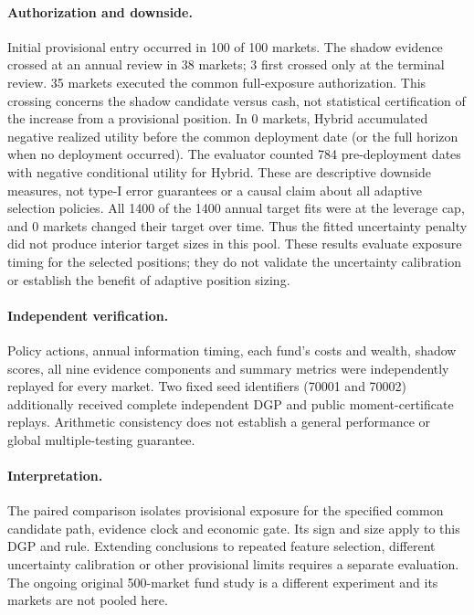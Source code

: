 \documentclass[10pt,a4paper]{article}
\begin{document}
\paragraph{Authorization and downside.}
Initial provisional entry occurred in 100 of 100 markets. The shadow evidence crossed at an annual review in 38 markets; 3 first crossed only at the terminal review. 35 markets executed the common full-exposure authorization. This crossing concerns the shadow candidate versus cash, not statistical certification of the increase from a provisional position. In 0 markets, Hybrid accumulated negative realized utility before the common deployment date (or the full horizon when no deployment occurred). The evaluator counted 784 pre-deployment dates with negative conditional utility for Hybrid. These are descriptive downside measures, not type-I error guarantees or a causal claim about all adaptive selection policies. All 1400 of the 1400 annual target fits were at the leverage cap, and 0 markets changed their target over time. Thus the fitted uncertainty penalty did not produce interior target sizes in this pool. These results evaluate exposure timing for the selected positions; they do not validate the uncertainty calibration or establish the benefit of adaptive position sizing.

\paragraph{Independent verification.}
Policy actions, annual information timing, each fund's costs and wealth,
shadow scores, all nine evidence components and summary metrics were
independently replayed for every market. Two fixed seed identifiers
(70001 and 70002) additionally received complete independent DGP and public
moment-certificate replays. Arithmetic consistency does not establish a
general performance or global multiple-testing guarantee.

\paragraph{Interpretation.}
The paired comparison isolates provisional exposure for the specified
common candidate path, evidence clock and economic gate. Its sign and size
apply to this DGP and rule. Extending conclusions to repeated feature
selection, different uncertainty calibration or other provisional limits
requires a separate evaluation. The ongoing original 500-market fund
study is a different experiment and its markets are not pooled here.
\end{document}
